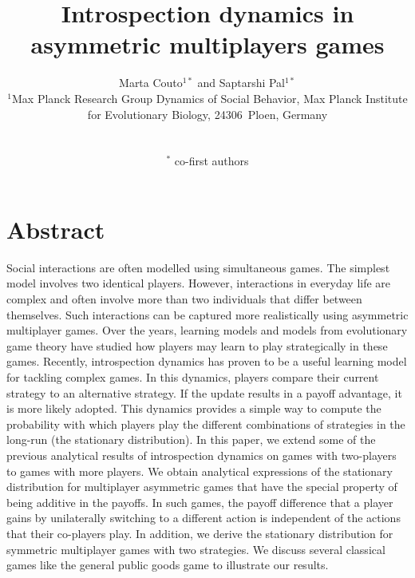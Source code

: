 \documentclass[11pt]{article}
\title{\sffamily \Large {\bfseries Introspection dynamics in asymmetric multiplayers games}}
\date{\empty}
\author{\parbox[c]{16cm}{\centering \onehalfspacing \fontsize{11}{12}\selectfont Marta Couto$^{1*}$ and Saptarshi Pal$^{1*}$\\[0.2cm]
$^1$Max Planck Research Group Dynamics of Social Behavior, Max Planck Institute for Evolutionary Biology, 24306~Ploen, Germany}\\ \\
$^*$ \fontsize{11}{12}\selectfont co-first authors}
\theoremstyle{plainCl1}
\theoremstyle{plainCl2}
\begin{document}
\maketitle
\onehalfspacing
\section*{Abstract}


Social interactions are often modelled using simultaneous games. The simplest model involves two identical players. However, interactions in everyday life are complex and often involve more than two individuals that differ between themselves. Such interactions can be captured more realistically using asymmetric multiplayer games. Over the years, learning models and models from evolutionary game theory have studied how players may learn to play strategically in these games. Recently, introspection dynamics has proven to be a useful learning model for tackling complex games. In this dynamics, players compare their current strategy to an alternative strategy. If the update results in a payoff advantage, it is more likely adopted. This dynamics provides a simple way to compute the probability with which players play the different combinations of strategies in the long-run (the stationary distribution). In this paper, we extend some of the previous analytical results of introspection dynamics on games with two-players to games with more players. We obtain analytical expressions of the stationary distribution for multiplayer asymmetric games that have the special property of being additive in the payoffs. In such games, the payoff difference that a player gains by unilaterally switching to a different action is independent of the actions that their co-players play. In addition, we derive the stationary distribution for symmetric multiplayer games with two strategies. We discuss several classical games like the general public goods game to illustrate our results. 
\end{document}
